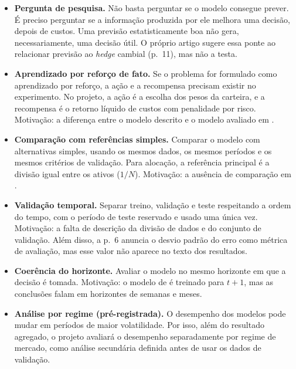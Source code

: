 \begin{itemize}
    \item \textbf{Pergunta de pesquisa.} Não basta perguntar se o modelo consegue prever. É preciso perguntar se a informação produzida por ele melhora uma decisão, depois de custos. Uma previsão estatisticamente boa não gera, necessariamente, uma decisão útil. O próprio artigo sugere essa ponte ao relacionar previsão ao \emph{hedge} cambial (p.~11), mas não a testa.

    \item \textbf{Aprendizado por reforço de fato.} Se o problema for formulado como aprendizado por reforço, a ação e a recompensa precisam existir no experimento. No projeto, a ação é a escolha dos pesos da carteira, e a recompensa é o retorno líquido de custos com penalidade por risco. Motivação: a diferença entre o modelo descrito e o modelo avaliado em \textcite{silva2026ia}.

    \item \textbf{Comparação com referências simples.} Comparar o modelo com alternativas simples, usando os mesmos dados, os mesmos períodos e os mesmos critérios de validação. Para alocação, a referência principal é a divisão igual entre os ativos ($1/N$). Motivação: a ausência de comparação em \textcite{silva2026ia}.

    \item \textbf{Validação temporal.} Separar treino, validação e teste respeitando a ordem do tempo, com o período de teste reservado e usado uma única vez. Motivação: a falta de descrição da divisão de dados e do conjunto de validação.    Além disso, a p.~6 anuncia o desvio padrão do erro como métrica de avaliação, mas esse valor não aparece no texto dos resultados.

    \item \textbf{Coerência do horizonte.} Avaliar o modelo no mesmo horizonte em que a decisão é tomada. Motivação: o modelo de \textcite{silva2026ia} é treinado para $t+1$, mas as conclusões falam em horizontes de semanas e meses.

    \item \textbf{Análise por regime (pré-registrada).} O desempenho dos modelos pode mudar em períodos de maior volatilidade. Por isso, além do resultado agregado, o projeto avaliará o desempenho separadamente por regime de mercado, como análise secundária definida antes de usar os dados de validação.
\end{itemize}

